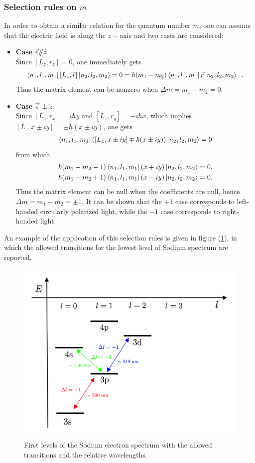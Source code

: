 \subsubsection{Selection rules on $m$}
In order to obtain a similar relation for the quantum number $m$, one can assume that the electric field is along the $z-$axis and two cases are considered: 
\begin{itemize}
    \item \textbf{Case $\vec{\epsilon} \mathbin{\!/\mkern-5mu/\!} \hat{z}$} \\
    Since $[L_z, r_z]=0$, one immediately gets
    \begin{equation*}
    \bra{n_1,l_1,m_1}[L_z,\Vec{r}]\ket{n_2,l_2,m_2} = 
        0 = \hbar(m_1-m_2)\bra{n_1,l_1,m_1}\Vec{r}\ket{n_2,l_2,m_2} \;\;.
    \end{equation*}
    Thus the matrix element can be nonzero when $\Delta m = m_1 - m_2 =0$. 
    \item \textbf{Case $\vec{\epsilon} \perp \hat{z}$} \\
    Since $[L_z, r_x ]= i\hbar y$ and $[L_z, r_y]=-i\hbar x$, which implies $[L_z, x\pm iy]=\pm\hbar(x\pm iy)$, one gets
    \begin{align*}
        \bra{n_1,l_1,m_1} \left( [L_z, x\pm iy] \mp \hbar(x\pm iy) \right) \ket{n_2,l_2,m_2} = 0
    \end{align*}
    from which
    \begin{align*}
        \hbar(m_1-m_2-1)\bra{n_1,l_1,m_1}(x+iy)\ket{n_2,l_2,m_2} &= 0, \\
        \hbar(m_1-m_2+1)\bra{n_1,l_1,m_1}(x-iy)\ket{n_2,l_2,m_2} &= 0.
    \end{align*}
    Thus the matrix element can be null when the coefficients are null, hence $\Delta m = m_1 - m_2 = \pm 1$. It can be shown that the $+1$ case corresponds to left-handed circularly polarized light, while the $-1$ case corresponds to right-handed light.
\end{itemize}

An example of the application of this selection rules is given in figure (\ref{fig:sodium_spectrum}), in which the allowed transitions for the lowest level of Sodium spectrum are reported.  

\begin{figure}[h]
\centering
    \includegraphics[width=0.7\linewidth]{images/Sodium_transition.png}
    \caption{First levels of the Sodium electron spectrum with the allowed transitions and the relative wavelengths.}
    \label{fig:sodium_spectrum}
\end{figure}





